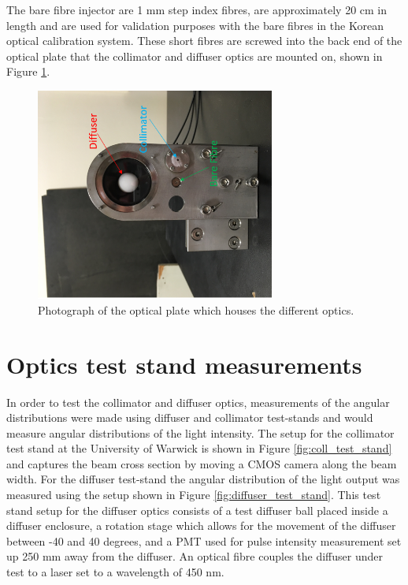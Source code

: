 The bare fibre injector are 1 mm step index fibres, are approximately 20 cm in length and are used for validation purposes with the bare fibres in the Korean optical calibration system. These short fibres are screwed into the back end of the optical plate that the collimator and diffuser optics are mounted on, shown in Figure \ref{fig:optical_plate}.

\begin{figure}
    \centering
    \includegraphics[width=0.7\textwidth, angle =270]{Figures/optical_plate.png}
    \caption{Photograph of the optical plate which houses the different optics.}
    \label{fig:optical_plate}
\end{figure}


\section{Optics test stand measurements}

In order to test the collimator and diffuser optics, measurements of the angular distributions were made using diffuser and collimator test-stands and would measure angular distributions of the light intensity. The setup for the collimator test stand at the University of Warwick is shown in Figure \ref{fig:coll_test_stand} and captures the beam cross section by moving a CMOS camera along the beam width. For the diffuser test-stand the angular distribution of the light output was measured using the setup shown in Figure \ref{fig:diffuser_test_stand}. This test stand setup for the diffuser optics consists of a test diffuser ball placed inside a diffuser enclosure, a rotation stage which allows for the movement of the diffuser between -40 and 40 degrees, and a PMT used for pulse intensity measurement set up 250 mm away from the diffuser. An optical fibre couples the diffuser under test to a laser set to a wavelength of 450 nm. 

